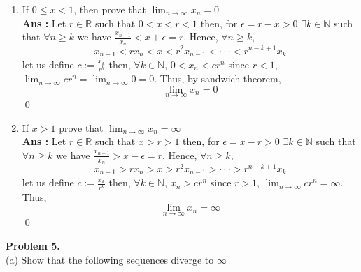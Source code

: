 \documentclass[10pt]{article}
\newcommand{\nn}{\mathbb{N}}
\newcommand{\inflim}{\lim_{n\to\infty}}
\newcommand{\sol}{\textbf{Ans : }}
\begin{document}
        \begin{enumerate}[label = {(\alph*)}]
        \item If $0 \leq x < 1$, then prove that $\inflim x_n = 0$\\
        \sol Let $r \in \mathbb{R}$ such that $0<x<r<1$ then, for $\epsilon = r - x > 0$ $\exists k \in \nn$ such that $\forall n \geq k$ we have $\frac{x_{n + 1}}{x_n} < x + \epsilon = r$. Hence, $\forall n \geq k$, $$x_{n+1} < rx_n < x <r^2x_{n-1}<\cdot \cdot \cdot < r^{n - k +1}x_k$$ let us define $c :=  \frac{x_k}{r^k}$ then, $\forall k \in \nn$, $0< x_n < cr^n$ since $r<1$, $\inflim cr^n = \inflim 0 = 0$. Thus, by sandwich theorem, $$\inflim x_n = 0$$\qed\\
        \item If $x > 1$ prove that $\inflim x_n = \infty$\\
        \sol Let $r \in \mathbb{R}$ such that $x>r>1$ then, for $\epsilon = x - r > 0$ $\exists k \in \nn$ such that $\forall n \geq k$ we have $\frac{x_{n + 1}}{x_n} > x - \epsilon = r$. Hence, $\forall n \geq k$, $$x_{n+1} > rx_n > x >r^2x_{n-1}>\cdot \cdot \cdot > r^{n - k +1}x_k$$ let us define $c :=  \frac{x_k}{r^k}$ then, $\forall k \in \nn$, $x_n > cr^n$ since $r>1$, $\inflim cr^n = \infty$. Thus, $$\inflim x_n = \infty$$\qed\\
        \end{enumerate}
        \textbf{Problem 5.} \\
        (a) Show that the following sequences diverge to $\infty$\\
\end{document}
